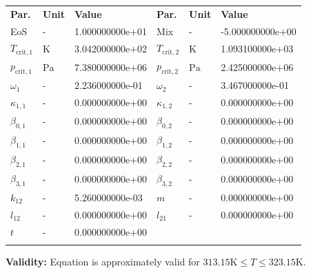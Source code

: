 \begin{longtable}[l]{lll|lll}
\toprule
\addlinespace
\textbf{Par.} & \textbf{Unit} & \textbf{Value} &	\textbf{Par.} & \textbf{Unit} & \textbf{Value} \\
\addlinespace
\midrule
\endhead

\bottomrule
\endfoot
\bottomrule
\endlastfoot
\addlinespace

EoS & - & 1.000000000e+01 & Mix & - & -5.000000000e+00 \\
$T_\mathrm{crit,1}$ & $\si{\kelvin}$ & 3.042000000e+02 & $T_\mathrm{crit,2}$ & $\si{\kelvin}$ & 1.093100000e+03 \\
$p_\mathrm{crit,1}$ & $\si{\pascal}$ & 7.380000000e+06 & $p_\mathrm{crit,2}$ & $\si{\pascal}$ & 2.425000000e+06 \\
$\omega_{1}$ & - & 2.236000000e-01 & $\omega_{2}$ & - & 3.467000000e-01 \\
$\kappa_{1,1}$ & - & 0.000000000e+00 & $\kappa_{1,2}$ & - & 0.000000000e+00 \\
$\beta_{0,1}$ & - & 0.000000000e+00 & $\beta_{0,2}$ & - & 0.000000000e+00 \\
$\beta_{1,1}$ & - & 0.000000000e+00 & $\beta_{1,2}$ & - & 0.000000000e+00 \\
$\beta_{2,1}$ & - & 0.000000000e+00 & $\beta_{2,2}$ & - & 0.000000000e+00 \\
$\beta_{3,1}$ & - & 0.000000000e+00 & $\beta_{3,2}$ & - & 0.000000000e+00 \\
$k_{12}$ & - & 5.260000000e-03 & $m$ & - & 0.000000000e+00 \\
$l_{12}$ & - & 0.000000000e+00 & $l_{21}$ & - & 0.000000000e+00 \\
$t$ & - & 0.000000000e+00 & & & \\

\addlinespace\end{longtable}

\textbf{Validity:}
\newline
Equation is approximately valid for $313.15 \si{\kelvin} \leq T \leq 323.15 \si{\kelvin}$.
\newline

